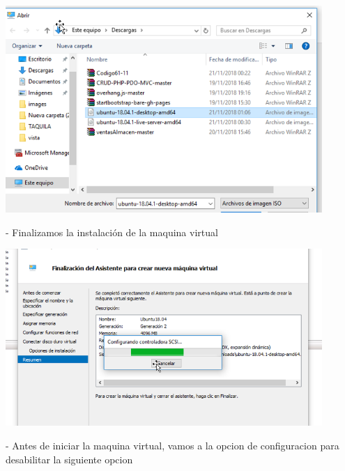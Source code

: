 \documentclass[12pt,letterpaper]{article}
\begin{document}
\begin{center}
	\includegraphics[width=12cm]{./Imagenes/12} 
\end{center}


\begin{itemize}
- Finalizamos la instalación de la maquina virtual\\
\end{itemize}

\begin{center}
	\includegraphics[width=12cm]{./Imagenes/13} 
	
\end{center}


\begin{itemize}
- Antes de iniciar la maquina virtual, vamos a la opcion de configuracion para desabilitar la siguiente opcion\\
\end{itemize}
\end{document}
